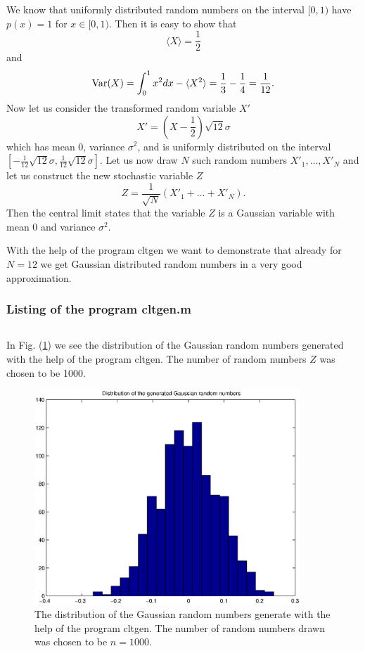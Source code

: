 We know that uniformly distributed random numbers on the interval
$[0,1)$ have $p(x) =1$ for $x\in[0,1)$. Then it is easy to show 
that 
\begin{equation*}
\langle X\rangle = \frac{1}{2}
\end{equation*}
and
\begin{equation*}
{\rm Var}(X) = \int_0^1 x^2 dx - \langle X^2\rangle = \frac{1}{3} 
        -\frac{1}{4} = \frac{1}{12}.
\end{equation*}
Now let us consider the transformed random variable $X'$
\begin{equation*}
X' = (X - \frac{1}{2})\sqrt{12} \sigma
\end{equation*}
which has mean $0$, variance $\sigma^2$, and is uniformly 
distributed on the interval 
$[-\frac{1}{12} \sqrt{12} \sigma, \frac{1}{12} \sqrt{12} \sigma].$
Let us now draw $N$ such random numbers $X'_1,\ldots, X'_N$
and let us construct
the new stochastic variable $Z$
\begin{equation*}
Z= \frac{1}{\sqrt{N}} (X'_1 + \ldots + X'_N).
\end{equation*}
Then the central limit states that the variable $Z$ is a Gaussian
variable with mean $0$ and variance $\sigma^2$.

With the help of the program {\sf cltgen} we want to demonstrate 
that already for $N=12$ we get Gaussian distributed random numbers
in a very good approximation.

\subsubsection{Listing of the program cltgen.m}
\begin{verbatim}

\end{verbatim}

In Fig. (\ref{F_CLTGEN}) we see the distribution of the Gaussian 
random numbers generated with the help of the program {\sf 
cltgen}. The number of random numbers $Z$ was chosen to be 1000.
\begin{figure}
\label{F_CLTGEN}
\includegraphics[width=10cm]{./Figures/f_cltgen.eps}
\caption{The distribution of the Gaussian random numbers generate
with the help of the program {\sf cltgen}. The number of random numbers 
drawn was chosen to be $n=1000$.}
\end{figure}


